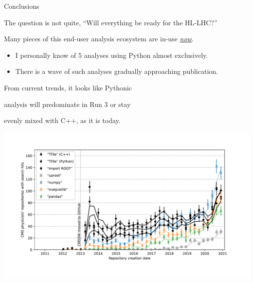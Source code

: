 \documentclass[aspectratio=169]{beamer}
\begin{document}
\begin{frame}{Conclusions}
\vspace{0.5 cm}
\large

The question is not quite, ``Will everything be ready for the HL-LHC?''

\vspace{0.5 cm}
Many pieces of this end-user analysis ecosystem are in-use \underline{\it now}.

\vspace{0.2 cm}
\begin{itemize}
\item I personally know of 5 analyses using Python almost exclusively.
\item There is a wave of such analyses gradually approaching publication.
\end{itemize}

\vspace{0.6 cm}
From current trends, it looks like Pythonic

analysis will predominate in Run 3 or stay

evenly mixed with C++, as it is today.

\vspace{-2.25 cm}
\hfill \mbox{\includegraphics[width=0.55\linewidth]{lhlhc-github-overlay-lin.pdf}\hspace{-1 cm}}

\vspace{-0.5 cm}
\end{frame}
\end{document}
